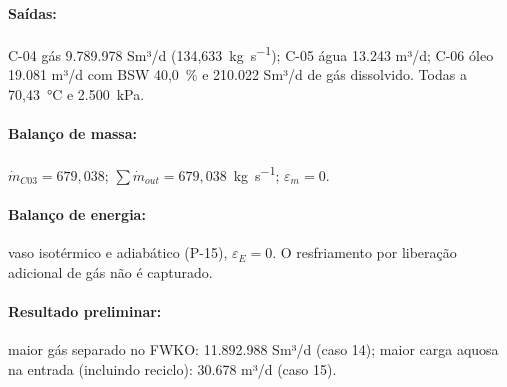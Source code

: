 \documentclass[11pt,a4paper]{article}
\numberwithin{equation}{section}
\numberwithin{table}{section}
\numberwithin{figure}{section}
\begin{document}
\paragraph{Saídas:} C-04 gás 9.789.978 Sm³/d (134,633~\si{\kilogram\per\second}); C-05 água 13.243 m³/d; C-06 óleo 19.081 m³/d com BSW 40,0~\% e 210.022 Sm³/d de gás dissolvido. Todas a 70,43~\si{\celsius} e 2.500~\si{\kilo\pascal}.
\paragraph{Balanço de massa:} $\dot m_{C03}=679,038$; $\sum\dot m_{out}=679,038$~\si{\kilogram\per\second}; $\varepsilon_m=$$0$.
\paragraph{Balanço de energia:} vaso isotérmico e adiabático (P-15), $\varepsilon_E=$$0$. O resfriamento por liberação adicional de gás não é capturado.
\paragraph{Resultado preliminar:} maior gás separado no FWKO: 11.892.988 Sm³/d (caso 14); maior carga aquosa na entrada (incluindo reciclo): 30.678 m³/d (caso 15).
\end{document}
